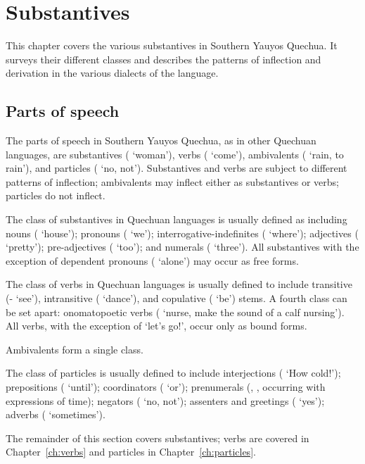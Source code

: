\chapter{Substantives}\label{ch:substantives}
This chapter covers the various substantives in Southern Yauyos Quechua. It surveys their different classes and describes the patterns of inflection and derivation in the various dialects of the language.

\section{Parts of speech}
The parts of speech in Southern Yauyos Quechua, as in other Quechuan languages, are substantives ( ‘woman’), verbs ( ‘come’), ambivalents ( ‘rain, to rain’), and particles ( ‘no, not’). Substantives and verbs are subject to different patterns of inflection; ambivalents may inflect either as substantives or verbs; particles do not inflect.

The class of substantives in Quechuan languages is usually defined as including nouns ( ‘house’); pronouns ( ‘we’); interrogative-indefinites ( ‘where’); adjectives ( ‘pretty’); pre-adjectives ( ‘too’); and numerals ( ‘three’). All substantives with the exception of dependent pronouns ( ‘alone’) may occur as free forms.

The class of verbs in Quechuan languages is usually defined to include transitive (- ‘see’), intransitive ( ‘dance’), and copulative ( ‘be’) stems. A fourth class can be set apart: onomatopoetic verbs ( ‘nurse, make the sound of a calf nursing’). All verbs, with the exception of  ‘let’s go!’, occur only as bound forms.

Ambivalents form a single class.

The class of particles is usually defined to include interjections ( ‘How cold!’); prepositions ( ‘until’); coordinators ( ‘or’); prenumerals (, , occurring with expressions of time); negators ( ‘no, not’); assenters and greetings ( ‘yes’); adverbs ( ‘sometimes’).

The remainder of this section covers substantives; verbs are covered in Chapter~\ref{ch:verbs} and particles in Chapter~\ref{ch:particles}.

